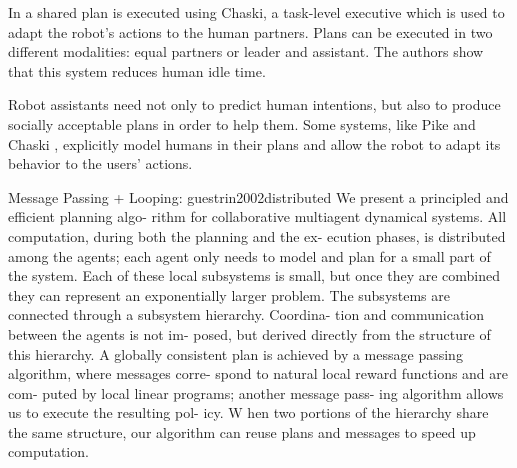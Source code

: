 In \cite{shah2011improved} a shared plan is executed
using Chaski, a task-level executive which is used to adapt the robot's actions to
the human partners. Plans can be executed in two different modalities:
equal partners or leader and assistant. The authors show that this
system reduces human idle time.


Robot assistants need not only to predict human intentions, but also to produce socially acceptable plans in order to help them. Some systems, like Pike \cite{karpas2015robust} and Chaski \cite{shah2011improved}, explicitly model humans in their plans and allow the robot to adapt its behavior to the users' actions.


Message Passing + Looping:
guestrin2002distributed
We present a principled and efficient planning algo-
rithm for collaborative multiagent dynamical systems.
All computation, during both the planning and the ex-
ecution phases, is distributed among the agents; each
agent only needs to model and plan for a small part
of the system. Each of these local subsystems is
small, but once they are combined they can represent
an exponentially larger problem. The subsystems are
connected through a subsystem hierarchy. Coordina-
tion and communication between the agents is not im-
posed, but derived directly from the structure of this
hierarchy. A globally consistent plan is achieved by
a message passing algorithm, where messages corre-
spond to natural local reward functions and are com-
puted by local linear programs; another message pass-
ing algorithm allows us to execute the resulting pol-
icy. W hen two portions of the hierarchy share the same
structure, our algorithm can reuse plans and messages
to speed up computation.


